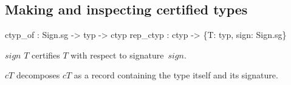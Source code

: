 \subsection{Making and inspecting certified types}
\begin{ttbox}
ctyp_of  : Sign.sg -> typ -> ctyp
rep_ctyp : ctyp -> \{T: typ, sign: Sign.sg\}
\end{ttbox}
\begin{ttdescription}
\item[\ttindexbold{ctyp_of} $sign$ $T$] 
certifies $T$ with respect to signature~$sign$.

\item[\ttindexbold{rep_ctyp} $cT$]
decomposes $cT$ as a record containing the type itself and its signature.
\end{ttdescription}

